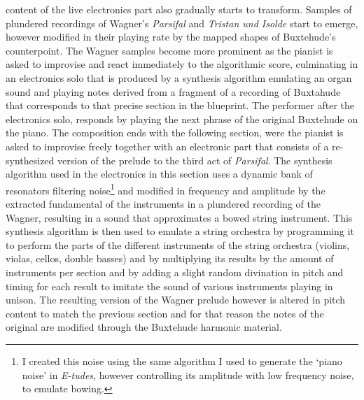content of the live electronics part also gradually starts to transform. Samples of plundered recordings of Wagner's \emph{Parsifal} and \emph{Tristan und Isolde} start to emerge, however modified in their playing rate by the mapped shapes of Buxtehude's counterpoint. The Wagner samples become more prominent as the pianist is asked to improvise and react immediately to the algorithmic score, culminating in an electronics solo that is produced by a synthesis algorithm emulating an organ sound and playing notes derived from a fragment of a recording of Buxtahude that corresponds to that precise section in the blueprint. The performer after the electronics solo, responds by playing the next phrase of the original Buxtehude on the piano. The composition ends with the following section, were the pianist is asked to improvise freely together with an electronic part that consists of a re-synthesized version of the prelude to the third act of \emph{Parsifal}. The synthesis algorithm used in the electronics in this section uses a dynamic bank of resonators filtering noise\footnote{I created this noise using the same algorithm I used to generate the `piano noise' in \emph{E-tudes}, however controlling its amplitude with low frequency noise, to emulate bowing.} and modified in frequency and amplitude by the extracted fundamental of the instruments in a plundered recording of the Wagner, resulting in a sound that approximates a bowed string instrument. This synthesis algorithm is then used to emulate a string orchestra by programming it to perform the parts of the different instruments of the string orchestra (violins, violas, cellos, double basses) and by multiplying its results by the amount of instruments per section and by adding a slight random divination in pitch and timing for each result to imitate the sound of various instruments playing in unison. The resulting version of the Wagner prelude however is altered in pitch content to match the previous section and for that reason the notes of the original are modified through the Buxtehude harmonic material. 
 
